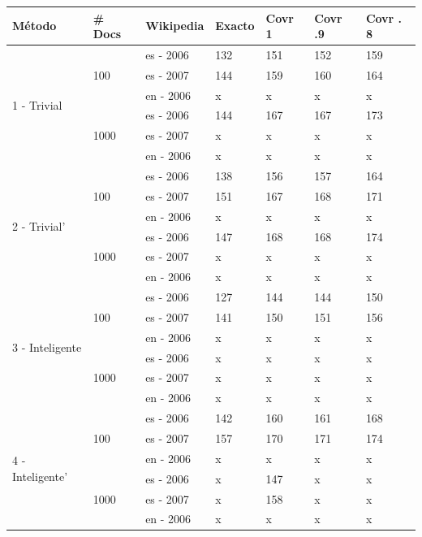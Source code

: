 \begin{center}
\begin{tabular}{|l|l|l|l|l|l|l|}
\hline
Método & \# Docs & Wikipedia & Exacto & Covr 1 & Covr .9 & Covr . 8 \\ \hline

\multirow{6}{*}{1 - Trivial} & 
\multirow{3}{*}{100} & es - 2006 & 132 & 151 & 152 & 159 \\ 
 &  & es - 2007 & 144 & 159 & 160 & 164 \\
 &  & en - 2006 & x & x & x & x \\ \cline{2-7}
 & \multirow{3}{*}{1000} & es - 2006 & 144 & 167 & 167 & 173 \\ 
 &  & es - 2007 & x & x & x & x \\
 &  & en - 2006 & x & x & x & x \\ \hline

\multirow{6}{*}{2 - Trivial'} & 
\multirow{3}{*}{100} & es - 2006 & 138 & 156 & 157 & 164 \\ 
 &  & es - 2007 & 151 & 167 & 168 & 171 \\
 &  & en - 2006 & x & x & x & x \\ \cline{2-7}
 & \multirow{3}{*}{1000} & es - 2006 & 147 & 168 & 168 & 174 \\ 
 &  & es - 2007 & x & x & x & x \\
 &  & en - 2006 & x & x & x & x \\ \hline

\multirow{6}{*}{3 - Inteligente} & 
\multirow{3}{*}{100} & es - 2006 & 127 & 144 & 144 & 150 \\ 
 &  & es - 2007 & 141 & 150 & 151 & 156 \\
 &  & en - 2006 & x & x & x & x \\ \cline{2-7}
 & \multirow{3}{*}{1000} & es - 2006 & x & x & x & x \\ 
 &  & es - 2007 & x & x & x & x \\
 &  & en - 2006 & x & x & x & x \\ \hline

\multirow{6}{*}{4 - Inteligente'} & 
\multirow{3}{*}{100} & es - 2006 & 142 & 160 & 161 & 168 \\ 
 &  & es - 2007 & 157 & 170 & 171 & 174  \\
 &  & en - 2006 & x & x & x & x \\ \cline{2-7}
 & \multirow{3}{*}{1000} & es - 2006 & x & 147 & x & x \\ 
 &  & es - 2007 & x & 158 & x & x \\
 &  & en - 2006 & x & x & x & x \\ \hline
 
\end{tabular}
\end{center}

